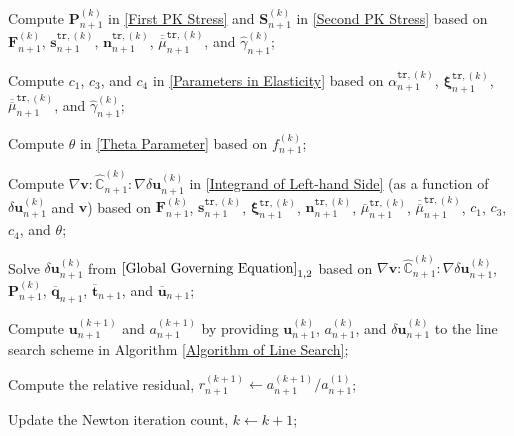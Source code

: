 \documentclass[preprint,11pt]{elsarticle}
\theoremstyle{definition}
\begin{document}
\begin{algorithm}[!htbp]
{{{            Compute $\mathbf{P}_{n+1}^{(k)}$ in \eqref{First PK Stress} and $\mathbf{S}_{n+1}^{(k)}$ in \eqref{Second PK Stress} based on $\mathbf{F}_{n+1}^{(k)}$, $\mathbf{s}_{n+1}^{\texttt{tr},(k)}$, $\mathbf{n}_{n+1}^{\texttt{tr},(k)}$, $\overline{\overline{\mu}}_{n+1}^{\texttt{tr},(k)}$, and $\widehat{\gamma}_{n+1}^{(k)}$;
            
            Compute $c_1$, $c_3$, and $c_4$ in \eqref{Parameters in Elasticity} based on $\alpha_{n+1}^{\texttt{tr},(k)}$, $\boldsymbol{\xi}_{n+1}^{\texttt{tr},(k)}$, $\overline{\overline{\mu}}_{n+1}^{\texttt{tr},(k)}$, and $\widehat{\gamma}_{n+1}^{(k)}$;
    
            Compute $\theta$ in \eqref{Theta Parameter} based on $f_{n+1}^{(k)}$;
    
            Compute $\nabla \mathbf{v} : \widehat{\mathbb{C}}_{n+1}^{(k)} : \nabla \delta \mathbf{u}_{n+1}^{(k)}$ in \eqref{Integrand of Left-hand Side} (as a function of $\delta \mathbf{u}_{n+1}^{(k)}$ and $\mathbf{v}$) based on $\mathbf{F}_{n+1}^{(k)}$, $\mathbf{s}_{n+1}^{\texttt{tr},(k)}$,  
            $\boldsymbol{\xi}_{n+1}^{\texttt{tr},(k)}$,
            $\mathbf{n}_{n+1}^{\texttt{tr},(k)}$,
            $\overline{\mu}_{n+1}^{\texttt{tr},(k)}$, $\overline{\overline{\mu}}_{n+1}^{\texttt{tr},(k)}$, $c_1$, $c_3$, $c_4$, and $\theta$;
    
            Solve $\delta \mathbf{u}_{n+1}^{(k)}$ from $\eqref{Global Governing Equation}_{1,2}$ based on $\nabla \mathbf{v} : \widehat{\mathbb{C}}_{n+1}^{(k)} : \nabla \delta \mathbf{u}_{n+1}^{(k)}$, $\mathbf{P}_{n+1}^{(k)}$, $\overline{\mathbf{q}}_{n+1}$, $\overline{\mathbf{t}}_{n+1}$, and $\overline{\mathbf{u}}_{n+1}$;
            
            Compute $\mathbf{u}_{n+1}^{(k+1)}$ and $a_{n+1}^{(k+1)}$ by providing $\mathbf{u}_{n+1}^{(k)}$, $a_{n+1}^{(k)}$, and $\delta \mathbf{u}_{n+1}^{(k)}$ to the line search scheme in Algorithm \ref{Algorithm of Line Search};
    
            Compute the relative residual, $r_{n+1}^{(k+1)} \leftarrow a_{n+1}^{(k+1)} / a_{n+1}^{(1)}$;

            Update the Newton iteration count, $k \leftarrow k+1$;

        }

}}
\end{algorithm}
\end{document}
